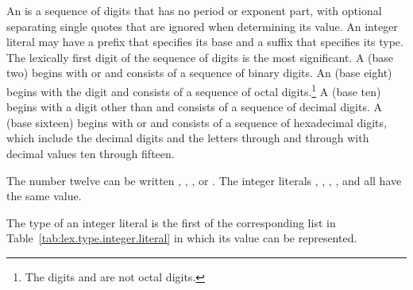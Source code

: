 \pnum
{}%
%
%
An  is a sequence of digits that has no period
or exponent part, with optional separating single quotes that are ignored
when determining its value. An integer literal may have a prefix that specifies
its base and a suffix that specifies its type. The lexically first digit
of the sequence of digits is the most significant.
A  (base two) begins with
 or  and consists of a sequence of binary digits.
An 
(base eight) begins with the digit  and consists of a
sequence of octal digits.\footnote{The digits  and  are not octal digits. }
A 
(base ten) begins with a digit other than  and
consists of a sequence of decimal digits.
A 
(base sixteen) begins with
 or  and consists of a sequence of hexadecimal
digits, which include the decimal digits and the letters 
through  and  through  with decimal values
ten through fifteen.
\begin{example} The number twelve can be written , ,
, or . The integer literals ,
, , , and
 all have the same value.
\end{example}

\pnum
{}%
%
%
%
%
%
%
%
The type of an integer literal is the first of the corresponding list
in Table~\ref{tab:lex.type.integer.literal} in which its value can be
represented.

